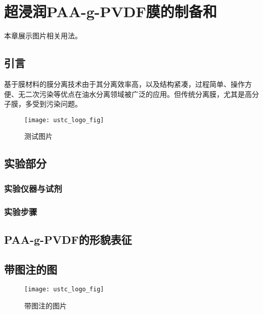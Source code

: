 \chapter{超浸润PAA-g-PVDF膜的制备和}
本章展示图片相关用法。

\section{引言}
基于膜材料的膜分离技术由于其分离效率高，以及结构紧凑，过程简单、操作方便、无二次污染等优点在油水分离领域被广泛的应用。但传统分离膜，尤其是高分子膜，多受到污染问题。

\begin{figure}[ht]
\centering
\texttt{[image: ustc\_logo\_fig]}
\caption{测试图片} \label{fig:figure1}
\end{figure}
\section{实验部分}
\subsection{实验仪器与试剂}
\subsection{实验步骤} 
\section{PAA-g-PVDF的形貌表征}
\section{带图注的图}
\begin{figure}[ht]
\centering
\texttt{[image: ustc\_logo\_fig]}
\caption{带图注的图片}\label{fig:noted-figure}
\end{figure}
